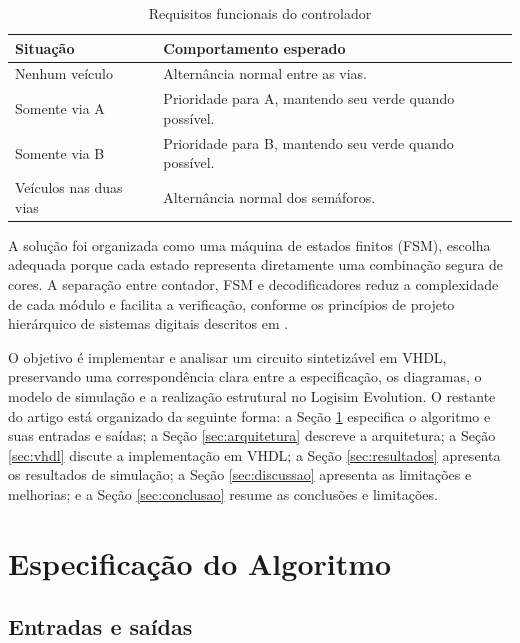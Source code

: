 \documentclass[conference]{IEEEtran}
\begin{document}
\begin{table}[!t]
\caption{Requisitos funcionais do controlador}
\label{tab:requisitos}
\centering
\footnotesize
\begin{tabular}{>{\raggedright\arraybackslash}p{}
                 >{\raggedright\arraybackslash}p{}}
\toprule
\textbf{Situação} & \textbf{Comportamento esperado}\\
\midrule
Nenhum veículo & Alternância normal entre as vias.\\
Somente via A & Prioridade para A, mantendo seu verde quando possível.\\
Somente via B & Prioridade para B, mantendo seu verde quando possível.\\
Veículos nas duas vias & Alternância normal dos semáforos.\\
\bottomrule
\end{tabular}
\end{table}

A solução foi organizada como uma máquina de estados finitos (FSM), escolha
adequada porque cada estado representa diretamente uma combinação segura de
cores. A separação entre contador, FSM e decodificadores reduz a complexidade
de cada módulo e facilita a verificação, conforme os princípios de projeto
hierárquico de sistemas digitais descritos em \cite{brown2015,wakerly2018}.

O objetivo é implementar e analisar um circuito sintetizável em VHDL,
preservando uma correspondência clara entre a especificação, os diagramas,
o modelo de simulação e a realização estrutural no Logisim Evolution. O
restante do artigo está organizado da seguinte forma: a Seção
\ref{sec:algoritmo} especifica o algoritmo e suas entradas e saídas; a Seção
\ref{sec:arquitetura} descreve a arquitetura; a Seção
\ref{sec:vhdl} discute a implementação em VHDL; a Seção
\ref{sec:resultados} apresenta os resultados de simulação; a Seção
\ref{sec:discussao} apresenta as limitações e melhorias; e a Seção
\ref{sec:conclusao} resume as conclusões e limitações.

\section{Especificação do Algoritmo}
\label{sec:algoritmo}

\subsection{Entradas e saídas}
\end{document}
